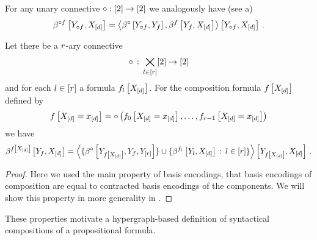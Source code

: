 For any unary connective $\circ: [2] \rightarrow[2]$ we analogously have (see a)
\begin{align*}
    \beta^{\circ f}\left[Y_{\circ f},X_{[d]}\right]
    = \left\langle 
        \beta^{\circ}\left[Y_{\circ f},Y_{f}\right],
        \beta^{f}\left[Y_{f},X_{[d]}\right]
    \right\rangle \left[ Y_{\circ f},X_{[d]} \right] \, .
\end{align*}

\begin{lemma}
    \label{lem:basisEncodingConnectiveComposition}
    Let there be a $r$-ary connective
    \begin{align*}
        \circ \,:\, \bigtimes_{l\in[r]}[2] \rightarrow [2]
    \end{align*}
    and for each $l\in[r]$ a formula $f_{l}\left[X_{[d]}\right]$.
    For the composition formula $f\left[X_{[d]}\right]$ defined by
    \begin{align*}
        f\left[X_{[d]}=x_{[d]}\right] =    \circ\left(f_{0}\left[X_{[d]}=x_{[d]}\right],\ldots,f_{r-1}\left[X_{[d]}=x_{[d]}\right]\right)
    \end{align*}
    we have
    \begin{align*}
        \beta^{f\left[X_{[d]}\right]}\left[Y_{f},X_{[d]}\right]
        = \left\langle 
            \{\beta^{\circ}\left[Y_{f\left[X_{[d]}\right]},Y_{f},Y_{[r]}\right]\}
            \cup \{\beta^{f_{l}}\left[Y_{l},X_{[d]}\right] \,:\, l\in[r] \}
        \right\rangle \left[ Y_{f\left[X_{[d]}\right]},X_{[d]} \right] \, .
    \end{align*}
\end{lemma}
\begin{proof}
    Here we used the main property of basis encodings, that basis encodings of composition are equal to contracted basis encodings of the components.
    We will show this property in more generality in .
\end{proof}


These properties motivate a hypergraph-based definition of syntactical compositions of a propositional formula. %

